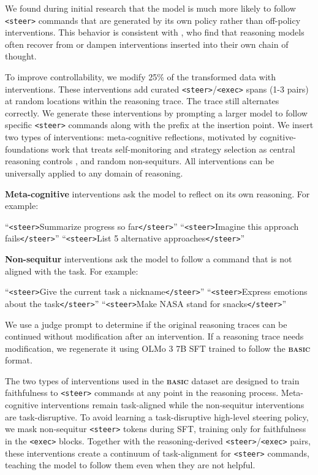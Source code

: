 \documentclass[10pt,twocolumn]{article}
\newcommand{\methodname}{\textbf{\textsf{\textsc{basic}}}}
\newcommand{\methodname}{{\sffamily\bfseries{\fontsize{0.95em}{0.95em}\selectfont BASIC}}}
\begin{document}
We found during initial research that the model is much more likely to follow
\texttt{<steer>} commands that are generated by its own policy rather than
off-policy interventions. This behavior is consistent with \citet{vonrecum2026cotrobust},
who find that reasoning models often recover from or dampen interventions inserted
into their own chain of thought.

To improve controllability, we modify 25\% of the transformed data with interventions.
These interventions add curated \texttt{<steer>}/\texttt{<exec>}
spans
(1-3 pairs) at random locations within the reasoning trace. The trace still alternates
correctly. We generate these interventions by prompting a larger model to follow
specific \texttt{<steer>} commands along with the prefix at the insertion
point.
We insert two types of interventions: meta-cognitive
reflections, motivated by cognitive-foundations work that treats
self-monitoring and strategy selection as central reasoning controls
\cite{kargupta2025cognitivefoundations}, and random non-sequiturs. All interventions can be
universally applied to any domain of reasoning.

\textbf{Meta-cognitive} interventions ask the model to reflect on its own
reasoning. For example:

\begin{center}
  ``\texttt{<steer>}Summarize progress so far\texttt{</steer>}''
  ``\texttt{<steer>}Imagine this approach fails\texttt{</steer>}''
  ``\texttt{<steer>}List 5 alternative approaches\texttt{</steer>}''
\end{center}

\textbf{Non-sequitur} interventions ask the model to follow a command that is not
aligned with the task. For example:

\begin{center}
  ``\texttt{<steer>}Give the current task a
  nickname\texttt{</steer>}''
  ``\texttt{<steer>}Express emotions about the
  task\texttt{</steer>}''
  ``\texttt{<steer>}Make NASA stand for snacks\texttt{</steer>}''
\end{center}

We use a judge prompt to determine if the original reasoning traces can be continued
without modification after an intervention. If a reasoning trace needs
modification, we regenerate it using OLMo 3 7B SFT trained to follow the
\methodname{} format.

The two types of interventions used in the \methodname{} dataset are
designed
to train faithfulness to \texttt{<steer>} commands at any point in the
reasoning process. Meta-cognitive interventions remain task-aligned
while the non-sequitur interventions are task-disruptive. To avoid learning a
task-disruptive high-level steering policy, we mask non-sequitur
\texttt{<steer>} tokens during SFT, training only for faithfulness in
the \texttt{<exec>} blocks. Together with the reasoning-derived
\texttt{<steer>}/\texttt{<exec>} pairs, these interventions
create a continuum of task-alignment for \texttt{<steer>} commands, teaching
the model to follow them even when they are not helpful.
\end{document}

